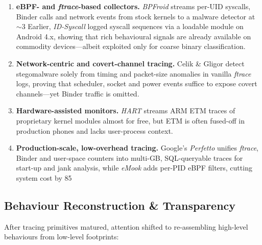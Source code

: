 \documentclass[a4paper,12pt]{report}
\begin{document}
\begin{enumerate}[label=(\alph*)]
  \item \textbf{eBPF- and \textit{ftrace}-based collectors.}
        \emph{BPFroid} streams per-UID syscalls, Binder calls and network events from stock kernels to a malware detector at $\sim$3 %
        Earlier, \emph{ID-Syscall} logged syscall sequences via a loadable module on Android 4.x, showing that rich behavioural signals are already available on commodity devices—albeit exploited only for coarse binary classification.

  \item \textbf{Network-centric and covert-channel tracing.}
        Celik \& Gligor detect stegomalware solely from timing and packet-size anomalies in vanilla \textit{ftrace} logs, proving that scheduler, socket and power events suffice to expose covert channels—yet Binder traffic is omitted.

  \item \textbf{Hardware-assisted monitors.}
        \emph{HART} streams ARM ETM traces of proprietary kernel modules almost for free, but ETM is often fused-off in production phones and lacks user-process context.

  \item \textbf{Production-scale, low-overhead tracing.}
        Google’s \emph{Perfetto} unifies \textit{ftrace}, Binder and user-space counters into multi-GB, SQL-queryable traces for start-up and jank analysis, while \emph{eMook} adds per-PID eBPF filters, cutting system cost by 85 %
\end{enumerate}

\subsection{Behaviour Reconstruction \& Transparency}
After tracing primitives matured, attention shifted to re-assembling high-level behaviours from low-level footprints:
\end{document}
